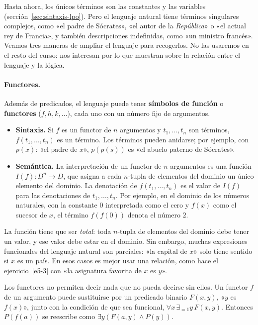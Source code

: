 Hasta ahora, los únicos términos son las constantes y las variables (sección~\ref{sec:sintaxis-lpo}). Pero el lenguaje natural tiene términos singulares complejos, como «el padre de Sócrates», «el autor de la \emph{República}» o «el actual rey de Francia», y también descripciones indefinidas, como «un ministro francés». Veamos tres maneras de ampliar el lenguaje para recogerlos. No las usaremos en el resto del curso: nos interesan por lo que muestran sobre la relación entre el lenguaje y la lógica.

\paragraph{Functores.} Además de predicados, el lenguaje puede tener \textbf{símbolos de función} o \textbf{functores} ($f, h, k, \dots$), cada uno con un número fijo de argumentos.
\begin{itemize}
    \item \textbf{Sintaxis.} Si $f$ es un functor de $n$ argumentos y $t_1, \dots, t_n$ son términos, $f(t_1, \dots, t_n)$ es un término. Los términos pueden anidarse; por ejemplo, con $p(x)$: «el padre de $x$», $p(p(s))$ es «el abuelo paterno de Sócrates».
    \item \textbf{Semántica.} La interpretación de un functor de $n$ argumentos es una función $I(f): D^n \to D$, que asigna a cada $n$-tupla de elementos del dominio un único elemento del dominio. La denotación de $f(t_1, \dots, t_n)$ es el valor de $I(f)$ para las denotaciones de $t_1, \dots, t_n$. Por ejemplo, en el dominio de los números naturales, con la constante $0$ interpretada como el cero y $f(x)$ como el sucesor de $x$, el término $f(f(0))$ denota el número $2$.
\end{itemize}
La función tiene que ser \emph{total}: toda $n$-tupla de elementos del dominio debe
tener un valor, y ese valor debe estar en el dominio. Sin embargo,
muchas expresiones funcionales del lenguaje natural son parciales: «la
capital de $x$» solo tiene sentido si $x$ es un país. En esos casos es
mejor usar una relación, como hace el ejercicio~\ref{e5-3} con «la
asignatura favorita de $x$ es $y$». 

Los functores no permiten decir nada que no pueda decirse sin
ellos. Un functor $f$ de un argumento puede sustituirse por un predicado binario $F(x,
y)$, «$y$ es $f(x)$», junto con la condición de que sea funcional,
$\forall x\, \exists_{= 1} y\, F(x, y)$. Entonces $P(f(a))$ se
reescribe como $\exists y (F(a, y) \land P(y))$.

